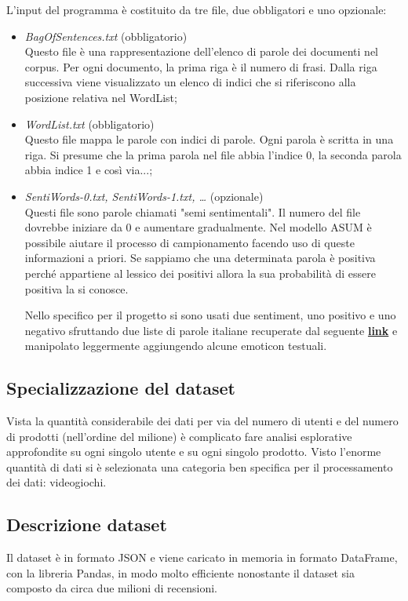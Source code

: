 \documentclass[a4paper,12pt]{article}
\begin{document}
\noindent L'input del programma è costituito da tre file, due obbligatori e uno opzionale:
\begin{itemize}
	\item \textit{BagOfSentences.txt} (obbligatorio)\\ 
	Questo file è una rappresentazione dell'elenco di parole dei documenti nel corpus.
	Per ogni documento, la prima riga è il numero di frasi. Dalla riga successiva viene visualizzato un elenco di indici che si riferiscono alla posizione relativa nel WordList;
	\item \textit{WordList.txt} (obbligatorio)\\
	Questo file mappa le parole con indici di parole. Ogni parola è scritta in una riga. Si presume che la prima parola nel file abbia l'indice 0, la seconda parola abbia indice 1 e così via...;
	\item \textit{SentiWords-0.txt, SentiWords-1.txt, … } (opzionale)\\
	Questi file sono parole chiamati "semi sentimentali". Il numero del file dovrebbe iniziare da 0 e aumentare gradualmente. Nel modello ASUM è possibile aiutare il processo di campionamento facendo uso di queste informazioni a priori. Se sappiamo che una determinata parola è positiva perché appartiene al lessico dei positivi allora la sua probabilità di essere positiva la si conosce. 
	
	Nello specifico per il progetto si sono usati due sentiment, uno positivo e uno negativo sfruttando due liste di parole italiane recuperate dal seguente \href{https://github.com/gragusa/sentiment-lang-italian}{\textbf{link}} e manipolato leggermente aggiungendo alcune emoticon testuali.
\end{itemize}

\newpage

\subsection{Specializzazione del dataset}
Vista la quantità considerabile dei dati per via del numero di utenti e del numero di prodotti (nell’ordine del milione) è complicato fare analisi esplorative approfondite su ogni singolo utente e su ogni singolo prodotto. 
Visto l'enorme quantità di dati si è selezionata una categoria ben specifica per il processamento dei dati: videogiochi.
\bigskip

\subsection{Descrizione dataset}
Il dataset è in formato JSON e viene caricato in memoria in formato DataFrame, con la libreria Pandas, in modo molto efficiente nonostante il dataset sia composto da circa due milioni di recensioni. 
\end{document}
